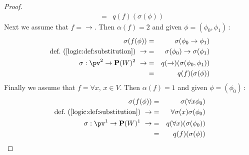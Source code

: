 \begin{proof}
\begin{eqnarray*}
        &=&q(f)(\sigma(\phi))
    \end{eqnarray*}
Next we assume that $f=\to$. Then $\alpha(f)=2$ and given
$\phi=(\phi_{0},\phi_{1})$\,:
    \begin{eqnarray*}
        \sigma(f(\phi))&=&\sigma(\phi_{0}\to\phi_{1})
        \\
        \mbox{def.~(\ref{logic:def:substitution})}\ \rightarrow
            &=&\sigma(\phi_{0})\to\sigma(\phi_{1})
        \\
        \sigma:\pv^{2}\to{\bf P}(W)^{2}\ \rightarrow
            &=&q(\to)(\sigma(\phi_{0},\phi_{1}))
        \\
        &=&q(f)(\sigma(\phi))
    \end{eqnarray*}
Finally we assume that $f=\forall x$, $x\in V$. Then $\alpha(f)=1$
and given $\phi=(\phi_{0})$\,:
    \begin{eqnarray*}
        \sigma(f(\phi))&=&\sigma(\forall x\phi_{0})
        \\
        \mbox{def.~(\ref{logic:def:substitution})}\ \rightarrow
            &=&\forall\sigma(x)\sigma(\phi_{0})
        \\
        \sigma:\pv^{1}\to{\bf P}(W)^{1}\ \rightarrow
            &=&q(\forall x)(\sigma(\phi_{0}))
        \\
        &=&q(f)(\sigma(\phi))
    \end{eqnarray*}
\end{proof}
